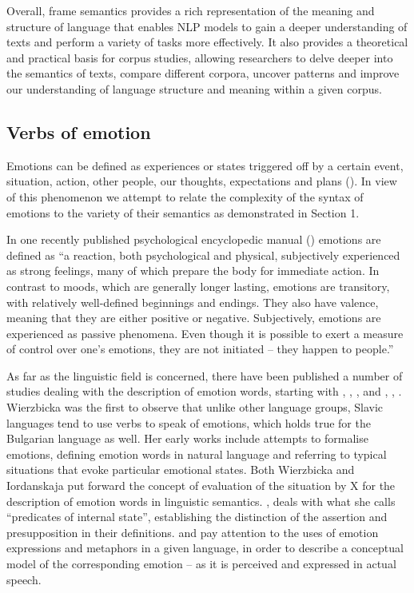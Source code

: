 \documentclass[output=paper,colorlinks,citecolor=brown]{langscibook}
\begin{document}
Overall, frame semantics provides a rich representation of the meaning and structure of language that enables NLP models to gain a deeper understanding of texts and perform a variety of tasks more effectively. It also provides a theoretical and practical basis for corpus studies, allowing researchers to delve deeper into the semantics of texts, compare different corpora, uncover patterns and improve our understanding of language structure and meaning within a given corpus.
 

\subsection{Verbs of emotion}

Emotions can be defined as experiences or states triggered off by a certain event, situation, action, other people, our thoughts, expectations and plans (\cite[155]{belaj2011cognitive}). In view of this phenomenon we attempt to relate the complexity of the syntax of emotions to the variety of their semantics as demonstrated in Section 1. 
 

In one recently published psychological encyclopedic manual (\cite[218]{Strickland2000}) emotions are defined as ``a reaction, both psychological and physical, subjectively experienced as strong feelings, many of which prepare the body for immediate action. In contrast to moods, which are generally longer lasting, emotions are transitory, with relatively well-defined beginnings and endings. They also have valence, meaning that they are either positive or negative. Subjectively, emotions are experienced as passive phenomena. Even though it is possible to exert a measure of control over one’s emotions, they are not initiated – they happen to people.''

 

As far as the linguistic field is concerned, there have been published a number of studies dealing with the description of emotion words, starting with  \citet{anna1971kocha}, \citet[57]{wierzbicka1972semantic}, \citet[142]{wierzbicka1980lingua}, \citet{wierzbicka1986human} and \citet{иорданская1970попытка}, \citet{iordanskaja1973tentative}, \citet{iordanskaja1986russian}. Wierzbicka was the first to observe that unlike other language groups, Slavic languages tend to use verbs to speak of emotions, which holds true for the Bulgarian language as well. Her early works include attempts to formalise emotions, defining emotion words in natural language and referring to typical situations that evoke particular emotional states. Both Wierzbicka and Iordanskaja put forward the concept of evaluation of the situation by X for the description of emotion words in linguistic semantics.  \citet{зализняк1983семантика}, \citet{зализняк1985функциональная} deals with what she calls ``predicates of internal state'', establishing the distinction of the assertion and presupposition in their definitions. \citet{Lakoff1987} and  \citet{kovecses1988language} pay attention to the uses of emotion expressions and metaphors in a given language, in order to describe a conceptual model of the corresponding emotion -- as it is perceived and expressed in actual speech.
\end{document}
